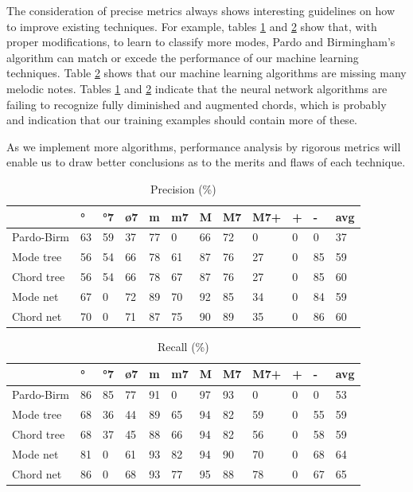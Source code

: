 \documentclass{article}
\begin{document}
The consideration of precise metrics always shows interesting
guidelines on how to improve existing techniques. For example, tables
\ref{tab:precision} and \ref{tab:recall} show that, with proper
modifications, to learn to classify more modes, Pardo and Birmingham's
algorithm can match or excede the performance of our machine learning
techniques. Table \ref{tab:recall} shows that our machine learning
algorithms are missing many melodic notes. Tables \ref{tab:precision}
and \ref{tab:recall} indicate that the neural network algorithms are
failing to recognize fully diminished and augmented chords, which is
probably and indication that our training examples should contain more
of these.

As we implement more algorithms, performance analysis by rigorous
metrics will enable us to draw better conclusions as to the merits and
flaws of each technique.


\begin{table}
  \centering
  \begin{tabular}{l|p{.1cm}p{.1cm}p{.1cm}p{.1cm}p{.1cm}p{.1cm}p{.1cm}p{.1cm}p{.1cm}p{.1cm}p{.1cm}}
                 &  °& °7& ø7& m&  m7&  M& M7&M7+& + &  -& avg\\
    \hline
    Pardo-Birm   & 63& 59& 37& 77&  0& 66& 72&  0&  0&  0& 37 \\
    Mode tree    & 56& 54& 66& 78& 61& 87& 76& 27&  0& 85& 59 \\
    Chord tree   & 56& 54& 66& 78& 67& 87& 76& 27&  0& 85& 60 \\
    Mode net     & 67&  0& 72& 89& 70& 92& 85& 34&  0& 84& 59 \\
    Chord net    & 70&  0& 71& 87& 75& 90& 89& 35&  0& 86& 60 \\
  \end{tabular}
  \caption{Precision (\%)}
  \label{tab:precision}
\end{table}

\begin{table}
  \centering
  \begin{tabular}{l|p{.1cm}p{.1cm}p{.1cm}p{.1cm}p{.1cm}p{.1cm}p{.1cm}p{.1cm}p{.1cm}p{.1cm}p{.1cm}}
                 &  °& °7& ø7& m&  m7&  M& M7&M7+& + &  -& avg\\
    \hline
    Pardo-Birm   & 86& 85& 77& 91&  0& 97& 93&  0&  0&  0& 53 \\
    Mode tree    & 68& 36& 44& 89& 65& 94& 82& 59&  0& 55& 59 \\
    Chord tree   & 68& 37& 45& 88& 66& 94& 82& 56&  0& 58& 59 \\
    Mode net     & 81&  0& 61& 93& 82& 94& 90& 70&  0& 68& 64 \\
    Chord net    & 86&  0& 68& 93& 77& 95& 88& 78&  0& 67& 65 \\
  \end{tabular}
  \caption{Recall (\%)}
  \label{tab:recall}
\end{table}
\end{document}
